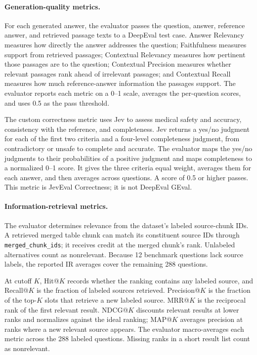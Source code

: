 \documentclass[sn-mathphys, oneside]{sn-jnl}
\begin{document}
\paragraph{Generation-quality metrics.}
For each generated answer, the evaluator passes the question, answer, reference answer, and retrieved passage texts to a DeepEval test case. Answer Relevancy measures how directly the answer addresses the question; Faithfulness measures support from retrieved passages; Contextual Relevancy measures how pertinent those passages are to the question; Contextual Precision measures whether relevant passages rank ahead of irrelevant passages; and Contextual Recall measures how much reference-answer information the passages support. The evaluator reports each metric on a 0--1 scale, averages the per-question scores, and uses 0.5 as the pass threshold.

The custom correctness metric uses Jev to assess medical safety and accuracy, consistency with the reference, and completeness. Jev returns a yes/no judgment for each of the first two criteria and a four-level completeness judgment, from contradictory or unsafe to complete and accurate. The evaluator maps the yes/no judgments to their probabilities of a positive judgment and maps completeness to a normalized 0--1 score. It gives the three criteria equal weight, averages them for each answer, and then averages across questions. A score of 0.5 or higher passes. This metric is JevEval Correctness; it is not DeepEval GEval.

\paragraph{Information-retrieval metrics.}
The evaluator determines relevance from the dataset's labeled source-chunk IDs. A retrieved merged table chunk can match its constituent source IDs through \texttt{merged\_chunk\_ids}; it receives credit at the merged chunk's rank. Unlabeled alternatives count as nonrelevant. Because 12 benchmark questions lack source labels, the reported IR averages cover the remaining 288 questions.

At cutoff $K$, Hit@$K$ records whether the ranking contains any labeled source, and Recall@$K$ is the fraction of labeled sources retrieved. Precision@$K$ is the fraction of the top-$K$ slots that retrieve a new labeled source. MRR@$K$ is the reciprocal rank of the first relevant result. NDCG@$K$ discounts relevant results at lower ranks and normalizes against the ideal ranking; MAP@$K$ averages precision at ranks where a new relevant source appears. The evaluator macro-averages each metric across the 288 labeled questions. Missing ranks in a short result list count as nonrelevant.
\end{document}
